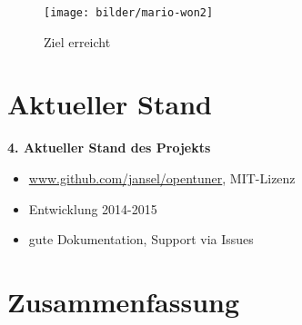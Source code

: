  \begingroup
  \begin{frame}
  
    \begin{figure}
    \centering\texttt{[image: bilder/mario-won2]}
    \caption{Ziel erreicht}
  \end{figure}
  
  \centering{}
  
  \end{frame}  
  \endgroup
  
  \section{Aktueller Stand}
  \begingroup
  \begin{frame}
  
  \textbf{4. Aktueller Stand des Projekts}
  
  \begin{itemize}
    \item \url{www.github.com/jansel/opentuner}, MIT-Lizenz
    \item Entwicklung 2014-2015
    \item gute Dokumentation, Support via Issues
  \end{itemize}
  
  
  
  \end{frame}  
  \endgroup
    
  \section{Zusammenfassung}
    
